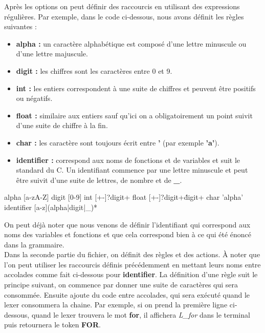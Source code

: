 \documentclass[a4paper]{article}%
\begin{document}
Après les options on peut définir des raccourcis en utilisant des expressions
régulières. Par exemple, dans le code ci-dessous, nous avons définit les règles
suivantes :

\begin{itemize}
  \item \textbf{alpha :} un caractère alphabétique est composé d'une lettre
    minuscule ou d'une lettre majuscule.
  \item \textbf{digit :} les chiffres sont les caractères entre 0 et 9.
  \item \textbf{int :} les entiers correspondent à une suite de chiffres et
    peuvent être positifs ou négatifs.
  \item \textbf{float :} similaire aux entiers sauf qu'ici on a obligatoirement
    un point suivit d'une suite de chiffre à la fin.
  \item \textbf{char :} les caractère sont toujours écrit entre \textbf{'} (par
    exemple \textbf{'a'}).
  \item \textbf{identifier :} correspond aux noms de fonctions et de variables
    et suit le standard du C. Un identifiant commence par une lettre minuscule
    et peut être suivit d'une suite de lettres, de nombre et de \textbf{\_}.
\end{itemize}

\begin{code}
alpha [a-zA-Z]
digit [0-9]
int [+-]?{digit}+
float [+-]?{digit}+\.{digit}+
char '{alpha}'
identifier [a-z]({alpha}|{digit}|_)*
\end{code}\leavevmode\newline

\noindent

On peut déjà noter que nous venons de définir l'identifiant qui correspond aux
noms des variables et fonctions et que cela correspond bien à ce qui été énoncé
dans la grammaire.\\

Dans la seconde partie du fichier, on définit des règles et des actions. À noter
que l'on peut utiliser les raccourcis définis précédemment en mettant leurs noms
entre accolades comme fait ci-dessous pour \textbf{identifier}. La définition
d'une règle suit le principe suivant, on commence par donner une suite de
caractères qui sera consommée. Ensuite ajoute du code entre accolades, qui
sera exécuté quand le \gls{lexer} consommera la chaine. Par exemple, si on prend la
première ligne ci-dessous, quand le \gls{lexer} trouvera le mot \textbf{for}, il
affichera \textit{L\_for} dans le terminal puis retournera le token \textbf{FOR}.
\end{document}
